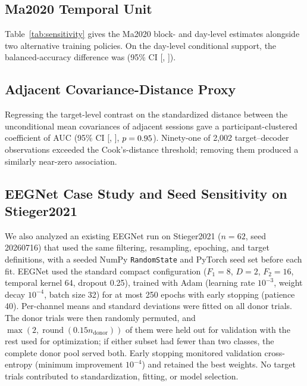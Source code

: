 \documentclass{ieeeaccess}
\begin{document}
\subsection{Ma2020 Temporal Unit}
Table~\ref{tab:sensitivity} gives the Ma2020 block- and day-level estimates
alongside two alternative training policies. On the day-level conditional support,
the balanced-accuracy
difference was \MaDayBA{} (95\% CI [\MaDayBALo{}, \MaDayBAHi{}]).



\subsection{Adjacent Covariance-Distance Proxy}
Regressing the target-level contrast on the standardized distance between the
unconditional mean covariances of adjacent sessions gave a participant-clustered
coefficient of \DriftRobustBeta{} AUC (95\% CI [\DriftRobustLo{},
\DriftRobustHi{}], $p = 0.95$). Ninety-one of 2,002 target--decoder
observations exceeded the Cook's-distance threshold; removing them produced a
similarly near-zero association.

\subsection{EEGNet Case Study and Seed Sensitivity on Stieger2021}
\label{app:eegnet}
We also analyzed an existing EEGNet run on Stieger2021 ($n=62$, seed 20260716)
that used the same filtering, resampling, epoching, and target definitions, with
a seeded NumPy \texttt{RandomState} and PyTorch seed set before each fit.
EEGNet \cite{lawhern2018eegnet} used the standard compact configuration
($F_1=8$, $D=2$, $F_2=16$, temporal kernel 64, dropout 0.25), trained with Adam
(learning rate $10^{-3}$, weight decay $10^{-4}$, batch size 32) for at most 250
epochs with early stopping (patience 40). Per-channel means and standard
deviations were fitted on all donor trials. The donor trials were then randomly
permuted, and $\max(2,\operatorname{round}(0.15n_{\mathrm{donor}}))$ of them
were held out for validation with the rest used for optimization; if either
subset had fewer than two classes, the complete donor pool served both. Early stopping monitored validation cross-entropy (minimum
improvement $10^{-4}$) and retained the best weights. No target trials
contributed to standardization, fitting, or model selection.
\end{document}

